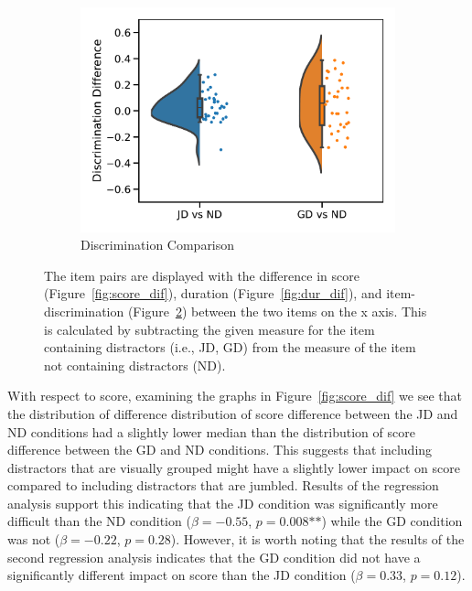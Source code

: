 \documentclass[authorversion,nonacm]{acmart}
\begin{document}
\begin{figure}
\begin{subfigure}[b]{0.30\textwidth}
    \includegraphics[width=\textwidth]{./imgs/discrim_dif.pdf}
    \caption{Discrimination Comparison}
    \label{fig:discrim_dif}
  \end{subfigure}
  \caption{The item pairs are displayed with the difference in score (Figure~\ref{fig:score_dif}), duration
  (Figure~\ref{fig:dur_dif}), and
  item-discrimination (Figure~\ref{fig:discrim_dif}) between the two items on
  the x axis. This is calculated by subtracting the given measure for the item containing
  distractors (i.e., JD, GD) from the measure of the item not containing
  distractors (ND).}
\end{figure}

With respect to score, examining the graphs in Figure~\ref{fig:score_dif} we
see that the distribution of difference distribution of score difference between
the JD and ND conditions had a slightly lower median than the distribution of
score difference between the GD and ND conditions. This suggests that including
distractors that are visually grouped might have a slightly lower impact on score
compared to including distractors that are jumbled. Results of the regression
analysis support this indicating that the JD condition was significantly more 
difficult than the ND condition ($\beta = -0.55$, $p = 0.008\text{**}$) while
the GD condition was not ($\beta = -0.22$, $p = 0.28$). However, it is worth
noting that the results of the second regression analysis indicates that the GD
condition did not have a significantly different impact on score than the JD
condition ($\beta = 0.33$, $p = 0.12$).
\end{document}
